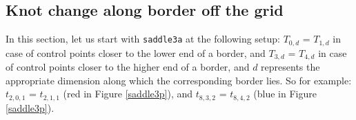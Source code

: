 \documentclass{article}
\begin{document}
\subsection{Knot change along border off the grid}

\vspace{6pt}

In this section, let us start with \texttt{saddle3a} at the following setup: $T_{0, d}$ = $T_{1, d}$ in case of control points closer to the lower end of a border, and $T_{3, d}$ = $T_{4, d}$ in case of control points closer to the higher end of a border, and $d$ represents the appropriate dimension along which the corresponding border lies. So for example: $t_{2, 0, 1}$ = $t_{2, 1, 1}$ (red in Figure \ref{saddle3p}), and $t_{8, 3, 2}$ = $t_{8, 4, 2}$ (blue in Figure \ref{saddle3p}).
\end{document}
